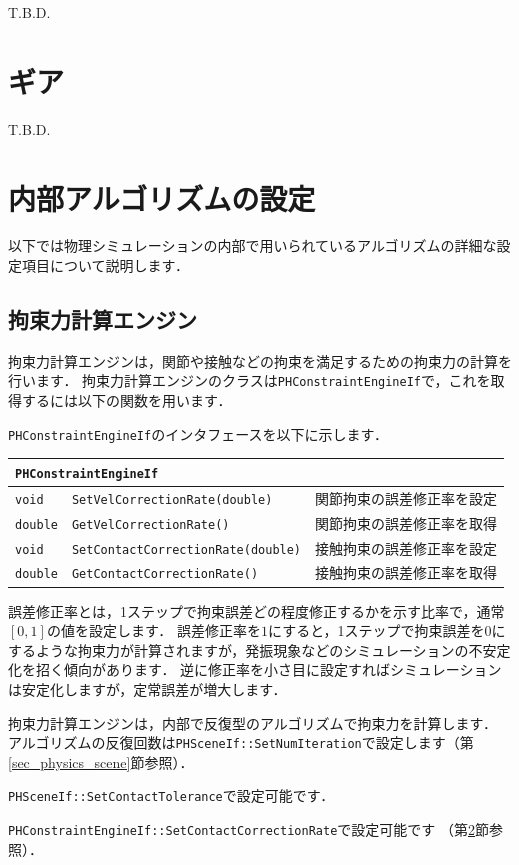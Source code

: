 T.B.D.


\section{ギア}

T.B.D.

\section{内部アルゴリズムの設定}
\label{sec_physics_engine}

\KLUDGE 以下では物理シミュレーションの内部で用いられているアルゴリズムの詳細な設定項目について説明します．

\subsection*{拘束力計算エンジン}

\KLUDGE 拘束力計算エンジンは，関節や接触などの拘束を満足するための拘束力の計算を行います．
\KLUDGE 拘束力計算エンジンのクラスは\texttt{PHConstraintEngineIf}で，これを取得するには以下の関数を用います．


\texttt{PHConstraintEngineIf}のインタフェースを以下に示します．

\begin{center}
\begin{longtable}{p{.12\hsize}p{.45\hsize}p{.33\hsize}}
\multicolumn{3}{l}{\texttt{PHConstraintEngineIf}}			\\ \midrule
\texttt{void}	& \texttt{SetVelCorrectionRate(double)}		& 関節拘束の誤差修正率を設定 \\
\texttt{double} & \texttt{GetVelCorrectionRate()}			& 関節拘束の誤差修正率を取得 \\
\texttt{void}	& \texttt{SetContactCorrectionRate(double)}	& 接触拘束の誤差修正率を設定 \\
\texttt{double} & \texttt{GetContactCorrectionRate()}		& 接触拘束の誤差修正率を取得 \\
\end{longtable}
\end{center}

\KLUDGE 誤差修正率とは，1ステップで拘束誤差どの程度修正するかを示す比率で，通常$[0, 1]$の値を設定します．
\KLUDGE 誤差修正率を$1$にすると，1ステップで拘束誤差を$0$にするような拘束力が計算されますが，発振現象などのシミュレーションの不安定化を招く傾向があります．
\KLUDGE 逆に修正率を小さ目に設定すればシミュレーションは安定化しますが，定常誤差が増大します．

\KLUDGE 拘束力計算エンジンは，内部で反復型のアルゴリズムで拘束力を計算します．
\KLUDGE アルゴリズムの反復回数は\texttt{PHSceneIf::SetNumIteration}で設定します（第\ref{sec_physics_scene}節参照）．


\texttt{PHSceneIf::SetContactTolerance}で設定可能です．

\texttt{PHConstraintEngineIf::SetContactCorrectionRate}で設定可能です
\KLUDGE （第\ref{sec_physics_engine}節参照）．
